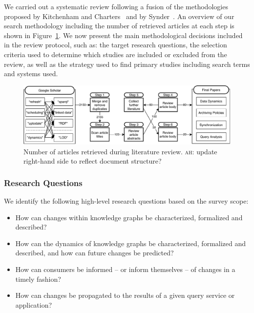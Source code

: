 \documentclass[sw]{iosart2x}
\newcommand{\ah}[1]{{\color{blue!70!black}\textsc{ah:} #1}}
\begin{document}
We carried out a systematic review following a fusion of the methodologies proposed by Kitchenham and Charters~\cite{keele07} and by Synder~\cite{snyder19}. An overview of our search methodology including the number of retrieved articles at each step is shown in Figure~\ref{fig:methodology}. We now present the main methodological decisions included in the review protocol, such as: the target research questions, the selection criteria used to determine which studies are included or excluded from the review, as well as the strategy used to find primary studies including search terms and systems used. %




\begin{figure}[h]
	\centering
	\includegraphics[scale=0.8]{img/methodology.pdf}
	\caption{Number of articles retrieved during literature review. \ah{update right-hand side to reflect document structure?}}
	\label{fig:methodology}
\end{figure}

\subsubsection{Research Questions}\label{Question}

We identify the following high-level research questions based on the survey scope: 

\begin{itemize}
\item How can changes within knowledge graphs be characterized, formalized and described?
\item How can the dynamics of knowledge graphs be characterized, formalized and described, and how can future changes be predicted?
\item How can consumers be informed -- or inform themselves -- of changes in a timely fashion?
\item How can changes be propagated to the results of a given query service or application?
\end{itemize}
\end{document}
